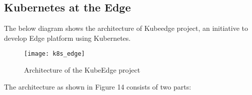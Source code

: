 \subsection{Kubernetes at the Edge}

\begin{flushleft}
The below diagram shows the architecture of Kubeedge project, an initiative to develop Edge platform using Kubernetes.
\end{flushleft}

\begin{figure}
    \centering
    \texttt{[image: k8s\_edge]}
    \label{fig:figure14}
    \caption{Architecture of the KubeEdge project}
\end{figure}

\begin{flushleft}
The architecture as shown in Figure 14 consists of two parts:
\end{flushleft}
